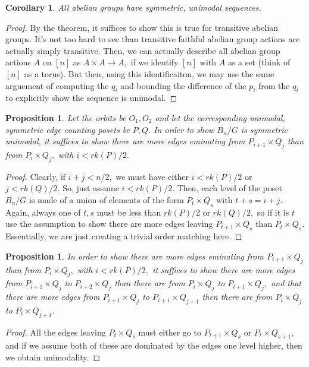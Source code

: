 \documentclass{amsart}
\newtheorem{cor}[subsubsection]{Corollary}
\newtheorem{prop}[subsubsection]{Proposition}
\begin{document}
\begin{cor}
All abelian groups have symmetric, unimodal sequences.
\end{cor}
\begin{proof}
By the theorem, it suffices to show this is true for transitive abelian groups. It's not too hard to see than transitive faithful abelian group actions are actually simply transitive. Then, we can actually describe all abelian group actions $A$ on $[n]$ as $A \times A \rightarrow A,$ if we identify $[n]$ with $A$ as a set (think of $[n]$ as a torus). But then, using this identificaiton, we may use the same arguement of computing the $q_i$ and bounding the difference of the $p_i$ from the $q_i$ to explicitly show the sequence is unimodal.
\end{proof}

\begin{prop}
Let the orbits be $O_1,O_2$ and let the corresponding unimodal, symmetric edge counting posets be $P,Q.$ In order to show $B_n/G$ is symmetric unimodal, it suffices to show there are more edges eminating from $P_{i+1} \times Q_j$ than from $P_i \times Q_j,$ with $i < rk(P)/2.$
\end{prop}
\begin{proof}
Clearly, if $i+j < n/2,$ we must have either $i < rk(P)/2$ or $j<rk(Q)/2.$ So, just assume $i < rk(P)/2.$ Then, each level of the poset $B_n/G$ is made of a union of elements of the form $P_t \times Q_s$ with $t + s = i+j.$ Again, always one of $t,s$ must be less than $rk(P)/2$ or $rk(Q)/2,$ so if it is $t$ use the assumption to show there are more edges leaving $P_{t+1} \times Q_s$ than $P_t \times Q_s.$ Essentially, we are just creating a trivial order matching here.
\end{proof}

\begin{prop}
In order to show  there are more edges eminating from $P_{i+1} \times Q_j$ than from $P_i \times Q_j,$ with $i < rk(P)/2,$ it suffices to show there are more edges from $P_{i+1} \times Q_j$ to $P_{i+2} \times Q_j$ than there are from $P_i \times Q_j$ to $P_{i+1} \times Q_j,$ and that there are more edges from $P_{i+1} \times Q_j$ to $P_{i+1} \times Q_{j+1}$ then there are from $P_i \times Q_j$ to $P_i \times Q_{j+1}.$
\end{prop}
\begin{proof}
All the edges leaving $P_t \times Q_s$ must either go to $P_{t+1} \times Q_s$ or $P_t \times Q_{s+1},$ and if we assume both of these are dominated by the edges one level higher, then we obtain unimodality.
\end{proof}
\end{document}
